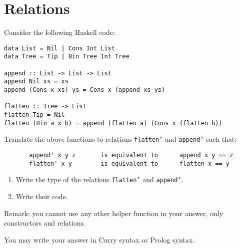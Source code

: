 \documentclass{article}
\begin{document}
\section{Relations}

Consider the following Haskell code:

\begin{verbatim}
data List = Nil | Cons Int List
data Tree = Tip | Bin Tree Int Tree

append :: List -> List -> List
append Nil xs = xs
append (Cons x xs) ys = Cons x (append xs ys)

flatten :: Tree -> List
flatten Tip = Nil
flatten (Bin a x b) = append (flatten a) (Cons x (flatten b))
\end{verbatim}

Translate the above functions to relations \texttt{flatten'} and
\texttt{append'} such that:
\begin{verbatim}
       append' x y z       is equivalent to      append x y == z
       flatten' x y        is equivalent to      flatten x == y
\end{verbatim}

\begin{enumerate}
\item Write the type of the relations \texttt{flatten'} and
  \texttt{append'}.
\item Write their code.
\end{enumerate}

Remark: you cannot use any other helper function in your answer, only
constructors and relations.

You may write your answer in Curry syntax or Prolog syntax.
\end{document}
